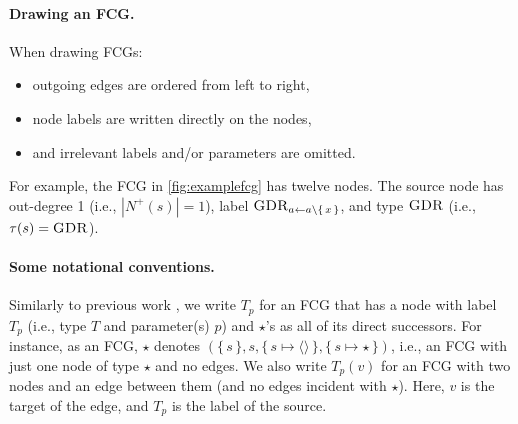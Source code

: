 
\paragraph*{Drawing an FCG.}
When drawing FCGs:
\begin{itemize}
  \item outgoing edges are ordered from left to right,
  \item node labels are written directly on the nodes,
  \item and irrelevant labels and/or parameters are omitted.
\end{itemize}
For example, the FCG in \cref{fig:examplefcg} has twelve nodes. The source
node has out-degree 1 (i.e., $|N^+(s)| = 1$), label
$\operatorname{\textsc{GDR}}_{a \gets a \setminus \{\, x \,\}}$, and type $\operatorname{\textsc{GDR}}$ (i.e.,
$\tau(s) = \operatorname{\textsc{GDR}}$).

\paragraph*{Some notational conventions.}
Similarly to previous work \citep{DBLP:conf/ijcai/BroeckTMDR11}, we write $T_p$
for an FCG that has a node with label $T_p$ (i.e., type $T$ and parameter(s)
$p$) and $\star$'s as all of its direct successors. For instance, as an FCG,
$\star$ denotes
$(\{\, s \,\}, s, \{\, s \mapsto \langle\rangle \,\}, \{\, s \mapsto \star \,\})$,
i.e., an FCG with just one node of type $\star$ and no edges. We also write
$T_p(v)$ for an FCG with two nodes and an edge between them (and no edges
incident with $\star$). Here, $v$ is the target of the edge, and $T_p$ is the
label of the source.

